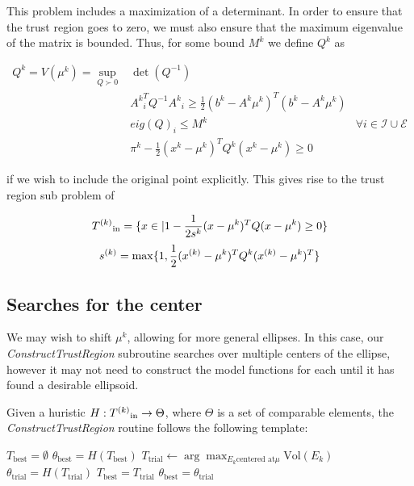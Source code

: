 This problem includes a maximization of a determinant.
In order to ensure that the trust region goes to zero, we must also ensure that the maximum eigenvalue of the matrix is bounded.
Thus, for some bound $M^k$ we define $Q^k$ as

\begin{center}
\begin{align}
\label{ellipse_1}
Q^k = V(\mu^k) = \sup_{Q \succ 0} & \det(Q^{-1}) & \\
  & {A^k}_i^T Q^{-1} {A^k}_i \ge \frac 1 2 (b^k - A^k\mu^{k})^T(b^k - A^k \mu^{k}) & \\
  & eig(Q)_i \le M^k & \forall i \in \mathcal I \cup \mathcal E \\
  & \pi^k - \frac 1 2 (x^k - \mu^{k})^TQ^{k}(x^k - \mu^{k}) \ge 0
\end{align}
\end{center}

if we wish to include the original point explicitly.
This gives rise to the trust region sub problem of

$${T^{(k)}}_{\text{in}} = \{x \in \mathbb | 1 - \frac 1 {2s^k} (x - \mu^{k})^T Q (x - \mu^{k}) \ge 0\} $$
$${s}^{(k)} = \max \{1, \frac 1 {2} ({x}^{(k)} - \mu^{k})^T Q^k ({x}^{(k)} - \mu^{k})^T \}$$


\subsection{Searches for the center}

We may wish to shift $\mu^k$, allowing for more general ellipses.
In this case, our \emph{ConstructTrustRegion} subroutine searches over multiple centers of the ellipse, however it may not need to construct the model functions for each until it has found a desirable ellipsoid.

Given a huristic $H : {T^{(k)}}_{\text{in}} \to \Theta$, where $\Theta$ is a set of comparable elements, the \emph{ConstructTrustRegion} routine follows the following template:

\begin{algorithmic}
    \State $T_{\text{best}} = \emptyset$
    \State $\theta_{\text{best}} = H(T_{\text{best}})$
        \State $T_{\text{trial}} \gets \arg\max_{E_k \text{centered at} \mu} \text{Vol}(E_k)$
        \State $\theta_{\text{trial}} = H(T_{\text{trial}})$
            \State $T_{\text{best}} = T_{\text{trial}}$
            \State $\theta_{\text{best}} = \theta_{\text{trial}}$
        \EndIf{}
    \EndFor
\EndProcedure
\end{algorithmic}

